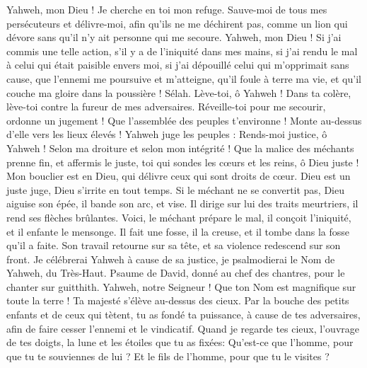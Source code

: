 \begin{multicols}{2}
Yahweh, mon Dieu ! Je cherche en toi mon refuge. Sauve-moi de tous mes persécuteurs et délivre-moi,
afin qu'ils ne me déchirent pas, comme un lion qui dévore sans qu'il n'y ait personne qui me secoure.
Yahweh, mon Dieu ! Si j'ai commis une telle action, s'il y a de l'iniquité dans mes mains,
si j'ai rendu le mal à celui qui était paisible envers moi, si j'ai dépouillé celui qui m'opprimait sans cause,
que l'ennemi me poursuive et m'atteigne, qu'il foule à terre ma vie, et qu'il couche ma gloire dans la poussière ! Sélah.
Lève-toi, ô Yahweh ! Dans ta colère, lève-toi contre la fureur de mes adversaires. Réveille-toi pour me secourir, ordonne un jugement !
Que l'assemblée des peuples t'environne ! Monte au-dessus d'elle vers les lieux élevés !
Yahweh juge les peuples : Rends-moi justice, ô Yahweh ! Selon ma droiture et selon mon intégrité !
Que la malice des méchants prenne fin, et affermis le juste, toi qui sondes les cœurs et les reins, ô Dieu juste !
Mon bouclier est en Dieu, qui délivre ceux qui sont droits de cœur.
Dieu est un juste juge, Dieu s'irrite en tout temps.
Si le méchant ne se convertit pas, Dieu aiguise son épée, il bande son arc, et vise.
Il dirige sur lui des traits meurtriers, il rend ses flèches brûlantes.
Voici, le méchant prépare le mal, il conçoit l'iniquité, et il enfante le mensonge.
Il fait une fosse, il la creuse, et il tombe dans la fosse qu'il a faite.
Son travail retourne sur sa tête, et sa violence redescend sur son front.
Je célébrerai Yahweh à cause de sa justice, je psalmodierai le Nom de Yahweh, du Très-Haut.
\VerseOne{}Psaume de David, donné au chef des chantres, pour le chanter sur guitthith.
Yahweh, notre Seigneur ! Que ton Nom est magnifique sur toute la terre ! Ta majesté s'élève au-dessus des cieux.
Par la bouche des petits enfants et de ceux qui tètent, tu as fondé ta puissance, à cause de tes adversaires, afin de faire cesser l'ennemi et le vindicatif.
Quand je regarde tes cieux, l'ouvrage de tes doigts, la lune et les étoiles que tu as fixées:
Qu'est-ce que l'homme, pour que tu te souviennes de lui ? Et le fils de l'homme, pour que tu le visites ?

\end{multicols}
